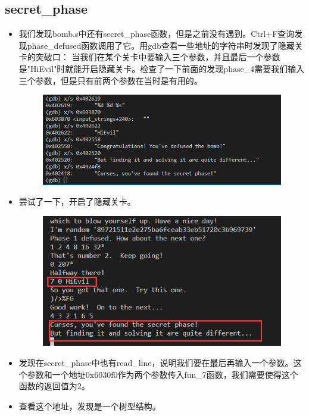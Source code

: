 \documentclass[12pt, a4paper, oneside]{ctexart}
\begin{document}
\subsection{secret\_phase}
\begin{itemize}
    \item 我们发现bomb.s中还有secret\_phase函数，但是之前没有遇到。Ctrl+F查询发现phase\_defused函数调用了它。用gdb查看一些地址的字符串时发现了隐藏关卡的突破口：
    当我们在某个关卡中要输入三个参数，并且最后一个参数是"HiEvil"时就能开启隐藏关卡。检查了一下前面的发现phase\_4需要我们输入三个参数，但是只有前两个参数在当时是有用的。
    \begin{figure}[htbp]
        \includegraphics[scale=0.7]{image/2.8-1.png}
    \end{figure}
    \item 尝试了一下，开启了隐藏关卡。
    \begin{figure}[htbp]
        \includegraphics[scale=0.5]{image/2.8-2.png}
    \end{figure}
    \item 发现在secret\_phase中也有read\_line，说明我们要在最后再输入一个参数。这个参数和一个地址0x6030f0作为两个参数传入fun\_7函数，我们需要使得这个函数的返回值为2。
    \item 查看这个地址，发现是一个树型结构。
    \begin{figure}[htbp]

\end{figure}
\end{itemize}
\end{document}
